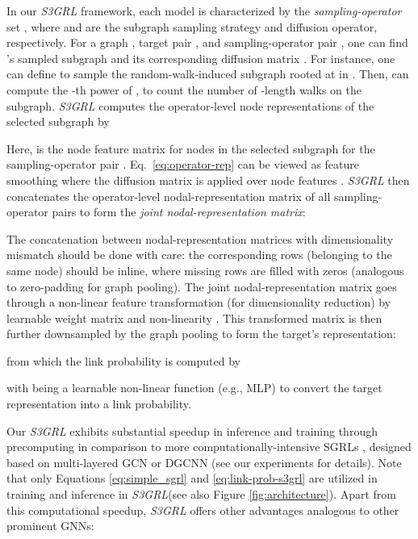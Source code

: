 \documentclass[sigconf, nonacm]{acmart}
\newcommand{\ssgrl}{\textit{S3GRL}\xspace}
\begin{document}
In our \ssgrl framework, each model is characterized by the \emph{sampling-operator} set , where  and   are the  subgraph sampling strategy and diffusion operator, respectively. For a graph , target pair , and  sampling-operator pair , one can find 's sampled subgraph  and its corresponding diffusion matrix . For instance, one can define  to sample the random-walk-induced subgraph  rooted at  in . Then,  can compute the -th power of , to count the number of -length walks on the subgraph. \ssgrl computes the operator-level node representations of the selected subgraph  by 
 
Here,  is the node feature matrix for nodes in the selected subgraph  for the sampling-operator pair . Eq.~\ref{eq:operator-rep} can be viewed as feature smoothing where the diffusion matrix  is applied over node features . \ssgrl then concatenates the operator-level nodal-representation matrix  of all sampling-operator pairs to form the \textit{joint nodal-representation matrix}:

The concatenation between nodal-representation matrices with dimensionality mismatch should be done with care: the corresponding rows (belonging to the same node) should be inline, where missing rows are filled with zeros (analogous to zero-padding for graph pooling). The joint nodal-representation matrix  goes through a non-linear feature transformation (for dimensionality reduction) by learnable weight matrix  and non-linearity . This transformed matrix is then further downsampled by the graph pooling  to form the target's representation:
 
from which the link probability is computed by 
 
with  being a learnable non-linear function (e.g., MLP) to convert the target representation  into a link probability. 




Our \ssgrl exhibits substantial speedup in inference and training through precomputing  in comparison to more computationally-intensive SGRLs  \cite{li2020distance,pan2022neural}, designed based on multi-layered GCN or DGCNN \cite{zhang2018end} (see our experiments for details). Note that only Equations \ref{eq:simple_sgrl} and \ref{eq:link-prob-s3grl} are utilized in training and inference in \ssgrl (see also Figure \ref{fig:architecture}).  Apart from this computational speedup, \ssgrl offers other advantages analogous to other prominent GNNs:
\end{document}
